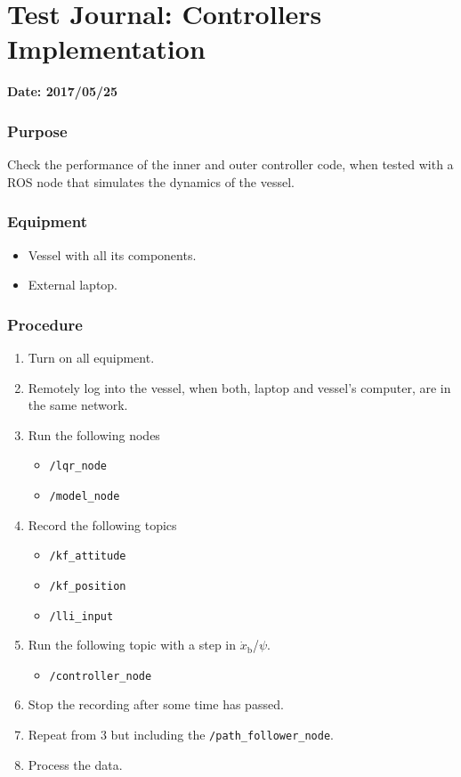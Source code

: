 \chapter{Test Journal: Controllers Implementation} \label{app:ModelNode}

\textbf{Date: 2017/05/25}

\subsection*{Purpose}
Check the performance of the inner and outer controller code, when tested with a ROS node that simulates the dynamics of the vessel.

\subsection*{Equipment}
\begin{itemize}
    \item Vessel with all its components. 
    \item External laptop.
\end{itemize}

\subsection*{Procedure}
\begin{enumerate}
    \item Turn on all equipment.
    \item Remotely log into the vessel, when both, laptop and vessel's computer, are in the same network.
    \item Run the following nodes
    \begin{itemize}
        \item \lstinline[style=cinline]{/lqr_node}  
        \item \lstinline[style=cinline]{/model_node}
    \end{itemize}
    \item Record the following topics
    \begin{itemize}
        \item \lstinline[style=cinline]{/kf_attitude}
        \item \lstinline[style=cinline]{/kf_position}   
        \item \lstinline[style=cinline]{/lli_input}  
    \end{itemize}
    \item Run the following topic with a step in $\dot{x}_\mathrm{b}$/$\psi$.
    \begin{itemize}
        \item \lstinline[style=cinline]{/controller_node}
    \end{itemize}
    \item Stop the recording after some time has passed.
    \item Repeat from 3 but including the \lstinline[style=cinline]{/path_follower_node}.
    \item Process the data.
\end{enumerate}

